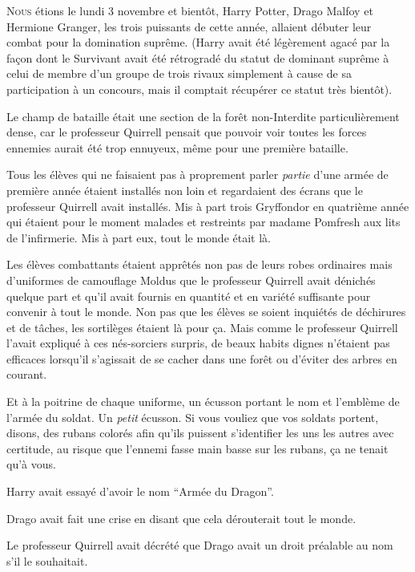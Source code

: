 
\lettrine{N}{ous} étions le lundi 3 novembre et bientôt, Harry Potter, Drago Malfoy et Hermione Granger, les trois puissants de cette année, allaient débuter leur combat pour la domination suprême.
(Harry avait été légèrement agacé par la façon dont le Survivant avait été rétrogradé du statut de dominant suprême à celui de membre d'un groupe de trois rivaux simplement à cause de sa participation à un concours, mais il comptait récupérer ce statut très bientôt).

Le champ de bataille était une section de la forêt non-Interdite particulièrement dense, car le professeur Quirrell pensait que pouvoir voir toutes les forces ennemies aurait été trop ennuyeux, même pour une première bataille.

Tous les élèves qui ne faisaient pas à proprement parler \emph{partie} d'une armée de première année étaient installés non loin et regardaient des écrans que le professeur Quirrell avait installés. Mis à part trois Gryffondor en quatrième année qui étaient pour le moment malades et restreints par madame Pomfresh aux lits de l'infirmerie. Mis à part eux, tout le monde était là.

Les élèves combattants étaient apprêtés non pas de leurs robes ordinaires mais d'uniformes de camouflage Moldus que le professeur Quirrell avait dénichés quelque part et qu'il avait fournis en quantité et en variété suffisante pour convenir à tout le monde. Non pas que les élèves se soient inquiétés de déchirures et de tâches, les sortilèges étaient là pour ça. Mais comme le professeur Quirrell l'avait expliqué à ces nés-sorciers surpris, de beaux habits dignes n'étaient pas efficaces lorsqu'il s'agissait de se cacher dans une forêt ou d'éviter des arbres en courant.

Et à la poitrine de chaque uniforme, un écusson portant le nom et l'emblème de l'armée du soldat. Un \emph{petit} écusson. Si vous vouliez que vos soldats portent, disons, des rubans colorés afin qu'ils puissent s'identifier les uns les autres avec certitude, au risque que l'ennemi fasse main basse sur les rubans, ça ne tenait qu'à vous.

Harry avait essayé d'avoir le nom “Armée du Dragon”.

Drago avait fait une crise en disant que cela dérouterait tout le monde.

Le professeur Quirrell avait décrété que Drago avait un droit préalable au nom s'il le souhaitait.

